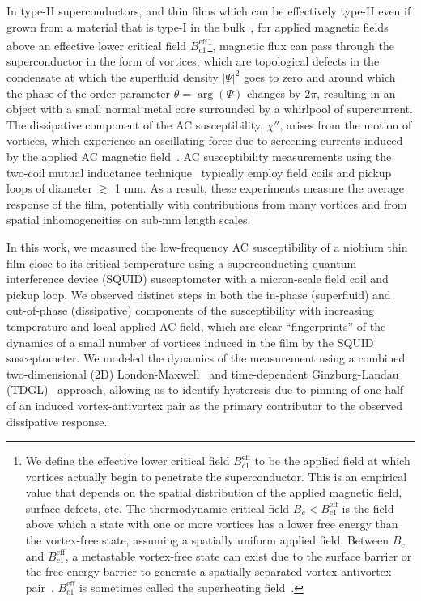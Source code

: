 \documentclass[%
 reprint,
 superscriptaddress,
 amsmath,
 amssymb,
 amsfonts,
 aps,
 prb,
]{revtex4-2}
\begin{document}
In type-II superconductors, and thin films which can be effectively type-II even if grown from a material that is type-I in the bulk~\cite{Tinkham1964-vo, Fetter1967-ui}, for applied magnetic fields above an effective lower critical field $B_{c1}^\mathrm{eff}$\footnote{We define the effective lower critical field $B_{c1}^\mathrm{eff}$ to be the applied field at which vortices actually begin to penetrate the superconductor. This is an empirical value that depends on the spatial distribution of the applied magnetic field, surface defects, etc. The thermodynamic critical field $B_c<B_{c1}^\mathrm{eff}$ is the field above which a state with one or more vortices has a lower free energy than the vortex-free state, assuming a spatially uniform applied field. Between $B_c$ and $B_{c1}^\mathrm{eff}$, a metastable vortex-free state can exist due to the surface barrier or the free energy barrier to generate a spatially-separated vortex-antivortex pair~\cite{Lemberger2013-ha,Lemberger2013-lu}. $B_{c1}^\mathrm{eff}$ is sometimes called the superheating field~\cite{Matricon1967-oh}.}, magnetic flux can pass through the superconductor in the form of vortices, which are topological defects in the condensate at which the superfluid density $|\Psi|^2$ goes to zero and around which the phase of the order parameter $\theta=\arg(\Psi)$ changes by $2\pi$, resulting in an object with a small normal metal core surrounded by a whirlpool of supercurrent.
The dissipative component of the AC susceptibility, $\chi''$, arises from the motion of vortices, which experience an oscillating force due to screening currents induced by the applied AC magnetic field~\cite{Clem1991-vq}. AC susceptibility measurements using the two-coil mutual inductance technique~\cite{Fiory1988-zw, Jeanneret1989-ss, Claassen1997-sb} typically employ field coils and pickup loops of diameter $\gtrsim$ 1 mm. As a result, these experiments measure the average response of the film, potentially with contributions from many vortices and from spatial inhomogeneities on sub-mm length scales.

In this work, we measured the low-frequency AC susceptibility of a niobium thin film close to its critical temperature using a superconducting quantum interference device (SQUID) susceptometer with a micron-scale field coil and pickup loop. We observed distinct steps in both the in-phase (superfluid) and out-of-phase (dissipative) components of the susceptibility with increasing temperature and local applied AC field, which are clear ``fingerprints'' of the dynamics of a small number of vortices induced in the film by the SQUID susceptometer. We modeled the dynamics of the measurement using a combined two-dimensional (2D) London-Maxwell~\cite{Brandt2004-ew,Brandt2005-wj,Bishop-Van_Horn2022-sy} and time-dependent Ginzburg-Landau (TDGL)~\cite{Watts-Tobin1981-mn, Kramer1978-kb, Jonsson2022-mb, Bishop-Van_Horn2023-dm} approach, allowing us to identify hysteresis due to pinning of one half of an induced vortex-antivortex pair as the primary contributor to the observed dissipative response.
\end{document}
